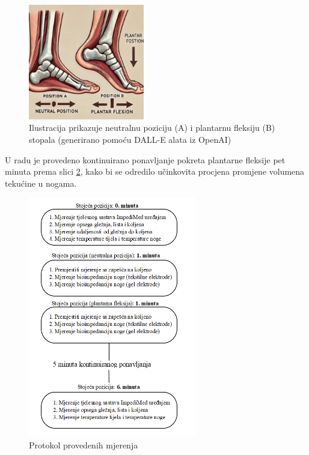 \documentclass[../diplomski_rad.tex]{subfiles}
\begin{document}
\begin{figure}[htb]
    \centering
    \includegraphics[width=0.45\textwidth]{Figures/plantarna_fleksija.jpg} 
    \caption{Ilustracija prikazuje neutralnu poziciju (A) i plantarnu fleksiju (B) stopala \newline (generirano pomoću DALL-E alata iz OpenAI)
    }
    \label{slk:plantarna_fleksija}
\end{figure}

U radu je provedeno kontinuirano ponavljanje pokreta plantarne fleksije pet minuta prema slici \ref{slk:protokol}, 
kako bi se odredilo učinkovita procjena promjene volumena tekućine u nogama. 

\begin{figure}[htb]
    \centering
    \includegraphics[width=0.65\textwidth]{Figures/protokol.png} 
    \caption{Protokol provedenih mjerenja}
    \label{slk:protokol}
\end{figure}
\end{document}
